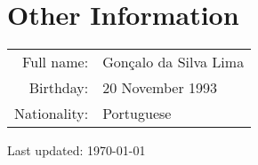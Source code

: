 \documentclass[a4paper,11pt]{article} %
\begin{document}
%


\section[Other Information]{\faInfoCircle \hspace{3pt} Other Information}

\begin{tabular}{rp{15cm}}
	Full name: & Gonçalo da Silva Lima \\
	Birthday: & 20 November 1993 \\
	Nationality: & Portuguese	\\
\end{tabular}

\vspace{2cm}
\begin{flushright}
	Last updated: \today \\
\end{flushright}
\end{document}
